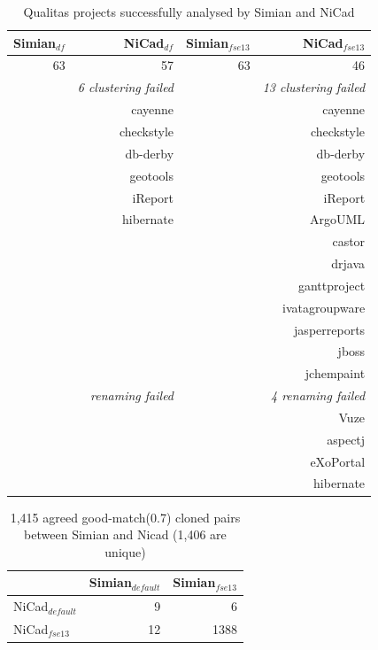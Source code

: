 \documentclass{IEEEtran}
\begin{document}
\begin{table}[h]
	\centering
	\caption{Qualitas projects successfully analysed by Simian and NiCad}
	\label{tab:projects_missing}
	\begin{tabular}{r|r|r|r}
		\hline
		Simian$_{df}$ & NiCad$_{df}$ & Simian$_{fse13}$ & NiCad$_{fse13}$ \\ \hline
		63	& 57 & 63 & 46 \\
		\hline
		& \textit{6 clustering failed} &  & \textit{13 clustering failed} \\
		\hline
		& cayenne   &	& cayenne \\
		& checkstyle &  & checkstyle \\
		& db-derby 	& & db-derby \\
		& geotools 	& & geotools \\
		& iReport 	& & iReport \\
		& hibernate & & ArgoUML \\
		&			& & castor \\
		&			& & drjava \\
		&			& & ganttproject \\
		&			& & ivatagroupware \\
		&			& & jasperreports \\
		&			& & jboss \\
		&			& & jchempaint \\
		\hline
		& \textit{renaming failed} & &  \textit{4 renaming failed} \\
		\hline
		&			& & Vuze \\
		&			& & aspectj \\
		&			& & eXoPortal \\
		&			& &  hibernate \\
		\hline
	\end{tabular}
\end{table}



\begin{table}[h]
	\centering
	\caption{1,415 agreed good-match(0.7) cloned pairs between Simian and Nicad (1,406 are unique)}
	\label{t_agreed_good_clone_pairs}
	\begin{tabular}{l|r|r}
		\hline
		& Simian$_{\mathrm{\textit{default}}}$ & Simian$_{\mathrm{\textit{fse13}}}$ \\ %
		\hline
		NiCad$_{\mathrm{\textit{default}}}$ & 9 & 6 \\ %
		NiCad$_{\mathrm{\textit{fse13}}}$   & 12 & 1388 \\ %
		\hline
	\end{tabular}
\end{table}
\end{document}
